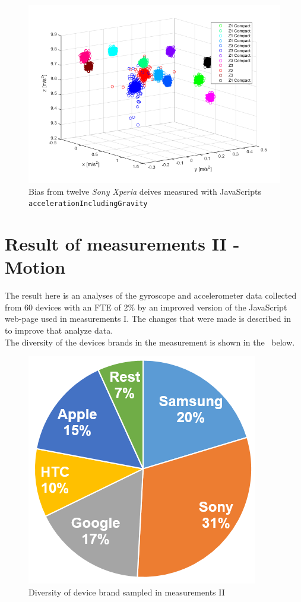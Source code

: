 \begin{figure}[H]
	\centering
	\includegraphics[scale=0.6]{img/res-measure1-scatter-inclG}
	\caption{Bias from twelve \textit{Sony Xperia} deives measured with JavaScripts \texttt{accelerationIncludingGravity}}
	\label{fig:scatter-withGrav}
\end{figure}

\section{Result of measurements II  - Motion}\label{res:testII}
The result here is an analyses of the gyroscope and accelerometer data collected from 60 devices with an FTE of 2\% by an improved version of the JavaScript web-page used in measurements I. The changes that were made is described in~ to improve that analyze data. \\
The diversity of the devices brands in the measurement is shown in the~ below. 
\begin{figure}[H]
	\centering
	\includegraphics[scale=.4]{img/measure2-brands}
	\caption{Diversity of device brand sampled in measurements II}
	\label{fig:brandII}
\end{figure}

